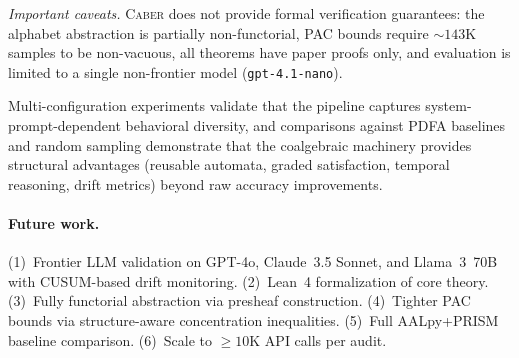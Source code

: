 \documentclass[11pt]{article}
\newcommand{\tool}{\textsc{Caber}}
\begin{document}
\emph{Important caveats.}
\tool{} does not provide formal verification guarantees:
the alphabet abstraction is partially non-functorial, PAC bounds require
${\sim}143$K samples to be non-vacuous, all theorems have paper proofs
only, and evaluation is limited to a single non-frontier model
(\texttt{gpt-4.1-nano}).

Multi-configuration experiments validate
that the pipeline captures system-prompt-dependent behavioral diversity,
and comparisons against PDFA baselines and random sampling demonstrate
that the coalgebraic machinery provides structural advantages
(reusable automata, graded satisfaction, temporal reasoning, drift
metrics) beyond raw accuracy improvements.

\paragraph{Future work.}
(1)~Frontier LLM validation on GPT-4o, Claude~3.5 Sonnet, and Llama~3~70B
with CUSUM-based drift monitoring.
(2)~Lean~4 formalization of core theory.
(3)~Fully functorial abstraction via presheaf construction.
(4)~Tighter PAC bounds via structure-aware concentration inequalities.
(5)~Full AALpy+PRISM baseline comparison.
(6)~Scale to ${\ge}10$K API calls per audit.
\end{document}
